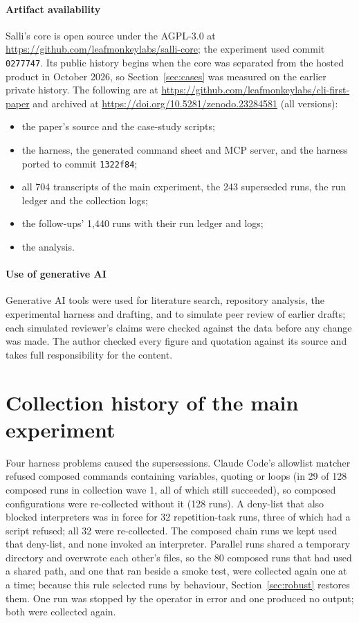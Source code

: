\documentclass[sigconf,nonacm]{acmart}
\newcommand{\sysA}{Salli}
\begin{document}
\paragraph{Artifact availability}
\sysA{}'s core is open source under the AGPL-3.0 at \url{https://github.com/leafmonkeylabs/salli-core}; the experiment used commit \texttt{0277747}. Its public history begins when the core was separated from the hosted product in October 2026, so Section~\ref{sec:cases} was measured on the earlier private history. The following are at \url{https://github.com/leafmonkeylabs/cli-first-paper} and archived at \url{https://doi.org/10.5281/zenodo.23284581} (all versions):
\begin{itemize}
\item the paper's source and the case-study scripts;
\item the harness, the generated command sheet and MCP server, and the harness ported to commit \texttt{1322f84};
\item all 704 transcripts of the main experiment, the 243 superseded runs, the run ledger and the collection logs;
\item the follow-ups' 1{,}440 runs with their run ledger and logs;
\item the analysis.
\end{itemize}

\paragraph{Use of generative AI}
Generative AI tools were used for literature search, repository analysis, the experimental harness and drafting, and to simulate peer review of earlier drafts; each simulated reviewer's claims were checked against the data before any change was made. The author checked every figure and quotation against its source and takes full responsibility for the content.




\appendix
\renewcommand{\thetable}{A\arabic{table}}
\setcounter{table}{0}

\section{Collection history of the main experiment}
\label{app:history}
Four harness problems caused the supersessions. Claude Code's allowlist matcher refused composed commands containing variables, quoting or loops (in 29 of 128 composed runs in collection wave 1, all of which still succeeded), so composed configurations were re-collected without it (128 runs). A deny-list that also blocked interpreters was in force for 32 repetition-task runs, three of which had a script refused; all 32 were re-collected. The composed chain runs we kept used that deny-list, and none invoked an interpreter. Parallel runs shared a temporary directory and overwrote each other's files, so the 80 composed runs that had used a shared path, and one that ran beside a smoke test, were collected again one at a time; because this rule selected runs by behaviour, Section~\ref{sec:robust} restores them. One run was stopped by the operator in error and one produced no output; both were collected again.
\end{document}
